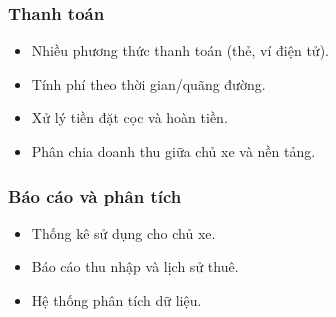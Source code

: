 \subsubsection*{Thanh toán}
\begin{itemize}
    \item Nhiều phương thức thanh toán (thẻ, ví điện tử).
    \item Tính phí theo thời gian/quãng đường.
    \item Xử lý tiền đặt cọc và hoàn tiền.
    \item Phân chia doanh thu giữa chủ xe và nền tảng.
\end{itemize}

\subsubsection*{Báo cáo và phân tích}
\begin{itemize}
    \item Thống kê sử dụng cho chủ xe.
    \item Báo cáo thu nhập và lịch sử thuê.
    \item Hệ thống phân tích dữ liệu.
\end{itemize}
